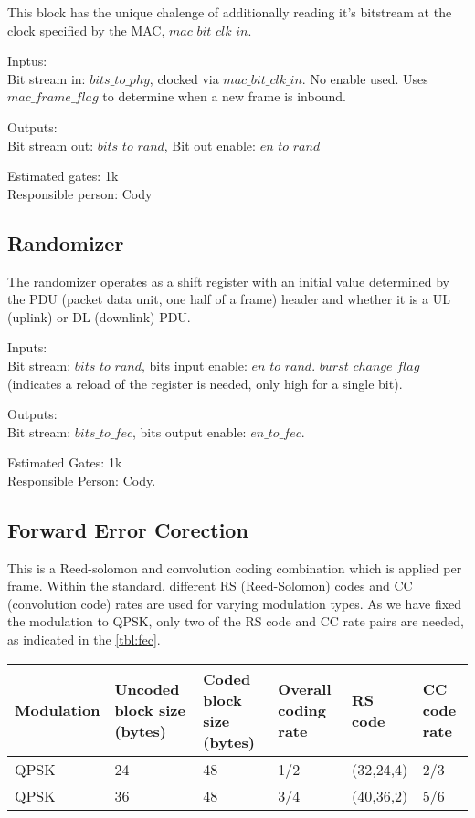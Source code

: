 \documentclass[10pt]{article}
\begin{document}
	This block has the unique chalenge of additionally reading it's
	bitstream at the clock specified by the MAC, $mac\_bit\_clk\_in$.

	Inptus: \\
	Bit stream in: $bits\_to\_phy$, clocked via $mac\_bit\_clk\_in$.  No
	enable used. Uses $mac\_frame\_flag$ to determine when a new frame is
	inbound.
	
	Outputs: \\
	Bit stream out: $bits\_to\_rand$, Bit out enable: $en\_to\_rand$

	Estimated gates: 1k \\
	Responsible person: Cody

	\subsection{Randomizer}
	\label{sec:rand}
	The randomizer operates as a shift register with an initial value
	determined by the PDU (packet data unit, one half of a frame) header
	and whether it is a UL (uplink) or DL (downlink) PDU.

	Inputs: \\
	Bit stream: $bits\_to\_rand$, bits input enable: $en\_to\_rand$.
	$burst\_change\_flag$ (indicates a reload of the register is needed,
	only high for a single bit).

	Outputs: \\
	Bit stream: $bits\_to\_fec$, bits output enable: $en\_to\_fec$.

	Estimated Gates: 1k \\
	Responsible Person: Cody.

	\subsection{Forward Error Corection}
	\label{sec:fec}
	This is a Reed-solomon and convolution coding combination which is
	applied per frame. Within the standard, different RS (Reed-Solomon)
	codes and CC (convolution code) rates are used for varying modulation
	types. As we have fixed the modulation to QPSK, only two of the RS
	code and CC rate pairs are needed, as indicated in the \autoref{tbl:fec}.
	
	

		\begin{tabular}{p{2cm}|p{2cm}|p{2cm}|p{2cm}|p{2cm}|p{2cm}}
		\label{tbl:fec}
			Modulation & Uncoded block size (bytes) & Coded block size (bytes) &
			Overall coding rate & RS code & CC code rate \\ \hline
			QPSK & 24 & 48 & 1/2 & (32,24,4) & 2/3 \\
			QPSK & 36 & 48 & 3/4 & (40,36,2) & 5/6
		\end{tabular}
\end{document}
